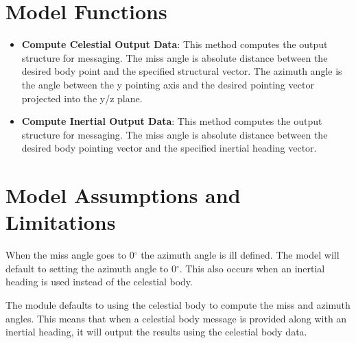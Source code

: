\section{Model Functions}
\begin{itemize}
	\item \textbf{Compute Celestial Output Data}: This method computes the output structure for messaging. The miss angle is absolute distance between the desired body point and the specified structural vector. The azimuth angle is the angle between the y pointing axis and the desired pointing vector projected into the y/z plane.
	\item  \textbf{Compute Inertial Output Data}: This method computes the output structure for messaging. The miss angle is absolute distance between the desired body pointing vector and the specified inertial heading vector.
\end{itemize}

\section{Model Assumptions and Limitations}

When the miss angle goes to 0$^{\circ}$ the azimuth angle is ill defined. The model will default to setting the azimuth angle to 0$^{\circ}$. This also occurs when an inertial heading is used instead of the celestial body.

The module defaults to using the celestial body to compute the miss and azimuth angles. This means that when a celestial body message is provided along with an inertial heading, it will output the results using the celestial body data.